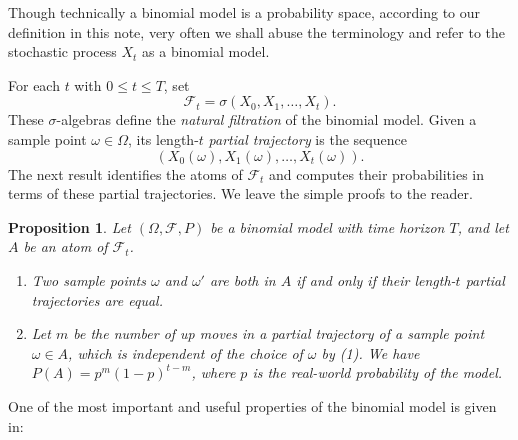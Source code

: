 \documentclass[reqno]{amsart}
\newtheorem{prop}[thm]{Proposition}
\theoremstyle{definition}
\numberwithin{equation}{section}
\begin{document}
Though technically a binomial model is a probability space, according to our definition in this note, very often we shall abuse the terminology and refer to the stochastic process $X_t$ as a binomial model.

For each $t$ with $0 \leq t \leq T$, set
	\[
	\mathcal{F}_t = \sigma(X_0,X_1,\ldots,X_t).
	\]
These $\sigma$-algebras define the \textit{natural filtration} of the binomial model. Given a sample point $\omega\in \Omega$, its length-$t$ \textit{partial trajectory} is the sequence
	\[
	(X_0(\omega), X_1(\omega),\ldots,X_t(\omega)).
	\]
The next result identifies the atoms of $\mathcal{F}_t$ and computes their probabilities in terms of these partial trajectories. We leave the simple proofs to the reader.

\begin{prop}\label{prop:atom-prob}
Let $(\Omega, \mathcal{F},P)$ be a binomial model with time horizon $T$, and let $A$ be an atom of $\mathcal{F}_t$.
\begin{enumerate}
\item Two sample points $\omega$ and $\omega'$ are both in $A$ if and only if their length-$t$ partial trajectories are equal.
\item Let $m$ be the number of up moves in a partial trajectory of a sample point $\omega \in A$, which is independent of the choice of $\omega$ by \textnormal{(1)}. We have $P(A) = p^m (1-p)^{t-m}$, where $p$ is the real-world probability of the model.
\end{enumerate}
\end{prop}

One of the most important and useful properties of the binomial model is given in:
\end{document}
